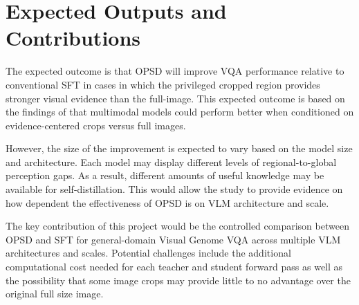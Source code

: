 \section{Expected Outputs and Contributions}

The expected outcome is that OPSD will improve VQA performance relative to conventional 
SFT in cases in which the privileged cropped region provides stronger visual evidence than the full-image.
This expected outcome is based on the findings of \textcite{yuan2026vision} that 
multimodal models could perform better when conditioned on evidence-centered crops versus full images.

However, the size of the improvement is expected to vary based on the model size and architecture.
Each model may display different levels of regional-to-global perception gaps. As a result, different
amounts of useful knowledge may be available for self-distillation. This would allow the study to provide 
evidence on how dependent the effectiveness of OPSD is on VLM architecture and scale.

The key contribution of this project would be the controlled comparison between OPSD and SFT for
general-domain Visual Genome VQA across multiple VLM architectures and scales. Potential challenges 
include the additional computational cost needed for each teacher and student forward pass as well as the 
possibility that some image crops may provide little to no advantage over the original full size image. 